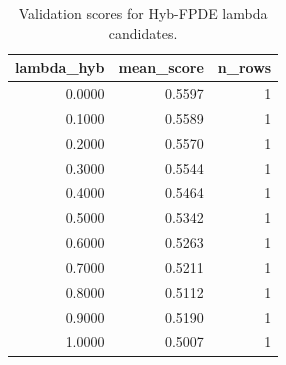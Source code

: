 \begin{table}[t]
\caption{Validation scores for Hyb-FPDE lambda candidates.}
\label{tab:lambda_distribution_computed}
\centering
\begin{tabular}{rrr}
\toprule
lambda\_hyb & mean\_score & n\_rows \\
\midrule
0.0000 & 0.5597 & 1 \\
0.1000 & 0.5589 & 1 \\
0.2000 & 0.5570 & 1 \\
0.3000 & 0.5544 & 1 \\
0.4000 & 0.5464 & 1 \\
0.5000 & 0.5342 & 1 \\
0.6000 & 0.5263 & 1 \\
0.7000 & 0.5211 & 1 \\
0.8000 & 0.5112 & 1 \\
0.9000 & 0.5190 & 1 \\
1.0000 & 0.5007 & 1 \\
\bottomrule
\end{tabular}

\end{table}
